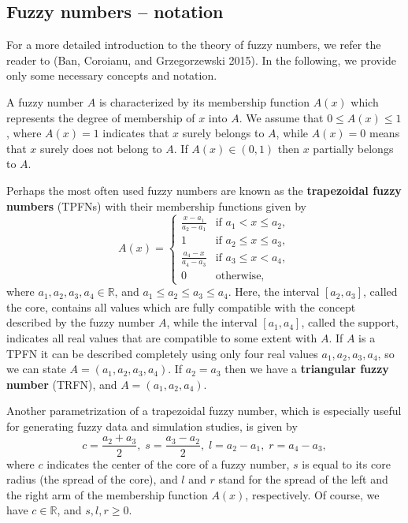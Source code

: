 \hypertarget{fuzzy-numbers-notation}{%
\subsection{Fuzzy numbers -- notation}\label{fuzzy-numbers-notation}}

For a more detailed introduction to the theory of fuzzy numbers, we
refer the reader to (Ban, Coroianu, and Grzegorzewski 2015). In the following, we provide
only some necessary concepts and notation.

A fuzzy number \(A\) is characterized by its membership function \(A(x)\)
which represents the degree of membership of \(x\) into \(A\). We assume
that \(0\leqslant A(x)\leqslant 1\), where \(A(x)=1\) indicates that \(x\)
surely belongs to \(A\), while \(A(x)=0\) means that \(x\) surely does not
belong to \(A\). If \(A(x)\in (0,1)\) then \(x\) partially belongs to \(A\).

Perhaps the most often used fuzzy numbers are known as the \textbf{trapezoidal
fuzzy numbers} (TPFNs) with their membership functions given by
\[A(x)=\begin{cases}
\frac{x-a_1}{a_2-a_1} & \text{if } a_1<x\leqslant a_2, \\
1 & \text{if } a_2\leqslant x\leqslant a_3, \\
\frac{a_4-x}{a_4-a_3} & \text{if } a_3\leqslant x<a_4, \\
0 & \text{otherwise},
\end{cases}
\label{eq:TPFN}\] where \(a_1,a_2,a_3,a_4\in\mathbb{R}\), and
\(a_1\leqslant a_2\leqslant a_3\leqslant a_4\). Here, the interval
\([a_2,a_3]\), called the core, contains all values which are fully
compatible with the concept described by the fuzzy number \(A\), while the
interval \([a_1,a_4]\), called the support, indicates all real values that
are compatible to some extent with \(A\). If \(A\) is a TPFN it can be
described completely using only four real values \(a_1,a_2,a_3,a_4\), so
we can state \(A=(a_1, a_2, a_3, a_4)\). If \(a_2=a_3\) then we have a
\textbf{triangular fuzzy number} (TRFN), and \(A = (a_1, a_2, a_4)\).

Another parametrization of a trapezoidal fuzzy number, which is
especially useful for generating fuzzy data and simulation studies, is
given by \[c  =\frac{a_2+a_3}{2}, \; 
s =\frac{a_3-a_2}{2}, \;
l =a_2-a_1, \;
r =a_4-a_3 ,
\label{eq:cslr}\] where \(c\) indicates the center of the core of a fuzzy
number, \(s\) is equal to its core radius (the spread of the core), and
\(l\) and \(r\) stand for the spread of the left and the right arm of the
membership function \(A(x)\), respectively. Of course, we have
\(c\in\mathbb{R}\), and \(s,l,r\geqslant 0\).


